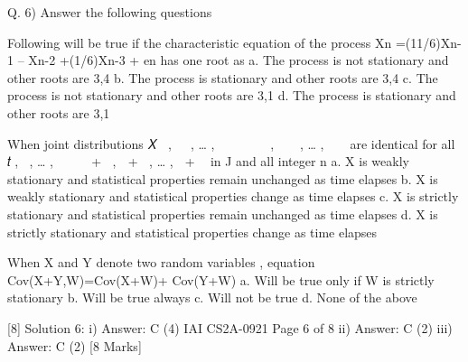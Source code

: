 Q. 6) Answer the following questions
\item Following will be true if the characteristic equation of the process
Xn =(11/6)Xn-1 – Xn-2 +(1/6)Xn-3 + en has one root as 
a. The process is not stationary and other roots are 3,4
b. The process is stationary and other roots are 3,4
c. The process is not stationary and other roots are 3,1
d. The process is stationary and other roots are 3,1

\item When joint distributions 𝑋􀯧􀰭 , 𝑋􀯧􀰮 , … , 𝑋􀯧􀳙 𝑎𝑛𝑑 𝑋􀯞􀬾􀯧􀰭 , 𝑋􀯞􀬾􀯧􀰮 , … , 𝑋􀯞􀬾􀯧􀳙 are identical for
all 𝑡􀬵, 𝑡􀬶, … , 𝑡􀯡 𝑎𝑛𝑑 𝑘 + 𝑡􀬵, 𝑘 + 𝑡􀬶, … , 𝑘 + 𝑡􀯡 in J and all integer n
a. X is weakly stationary and statistical properties remain unchanged as time elapses
b. X is weakly stationary and statistical properties change as time elapses
c. X is strictly stationary and statistical properties remain unchanged as time elapses
d. X is strictly stationary and statistical properties change as time elapses

\item When X and Y denote two random variables , equation Cov(X+Y,W)=Cov(X+W)+
Cov(Y+W)
a. Will be true only if W is strictly stationary
b. Will be true always
c. Will not be true
d. None of the above

[8]
Solution 6:
i)
Answer: C
(4)
IAI CS2A-0921
Page 6 of 8
ii)
Answer: C
(2)
iii)
Answer: C
(2)
[8 Marks]